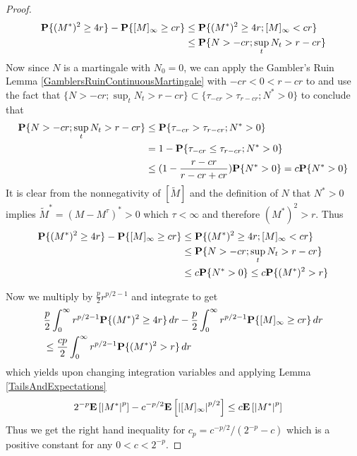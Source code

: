 \begin{proof}
\begin{align*}
\textbf{P}\{(M^*)^2 \geq 4r\} - \textbf{P}\{[M]_\infty \geq cr\} &\leq \textbf{P}\{(M^*)^2 \geq 4r; [M]_\infty < cr\} \\
&\leq \textbf{P}\{N > -cr; \sup_t N_t > r - cr\}
\end{align*}
Now since $N$ is a martingale with $N_0 = 0$, we can apply the Gambler's Ruin Lemma \ref{GamblersRuinContinuousMartingale} with $-cr < 0 < r - cr$ to and use the fact that $\lbrace N > -cr; \sup_t N_t > r - cr \rbrace \subset \lbrace \tau_{-cr} > \tau_{r - cr} ; N^* > 0 \rbrace$ to conclude that 
\begin{align*}
\textbf{P}\{N > -cr; \sup_t N_t > r - cr\} &\leq \textbf{P}\{\tau_{-cr} > \tau_{r - cr} ; N^* > 0\} \\
&= 1 - \textbf{P}\{\tau_{-cr} \leq \tau_{r - cr} ; N^* > 0\} \\
&\leq (1 - \frac{r - cr}{r -cr + cr})\textbf{P}\{N^* > 0\} = c \textbf{P}\{N^* > 0\}
\end{align*}
It is clear from the nonnegativity of $[\tilde{M}]$ and the definition of $N$ that $N^* > 0$ implies $\tilde{M}^*= (M-M^\tau)^* > 0$ which $\tau < \infty$ and therefore $(M^*)^2 > r$.  Thus
\begin{align*}
\textbf{P}\{(M^*)^2 \geq 4r\} - \textbf{P}\{[M]_\infty \geq cr\} &\leq \textbf{P}\{(M^*)^2 \geq 4r; [M]_\infty < cr\} \\
&\leq \textbf{P}\{N > -cr; \sup_t N_t > r - cr\} \\
&\leq c \textbf{P}\{N^* > 0\} \leq c \textbf{P}\{(M^*)^2 > r\}
\end{align*}

Now we multiply by $\frac{p}{2}r^{p/2-1}$ and integrate to get 
\begin{align*}
&\frac{p}{2}\int_0^\infty r^{p/2-1}\textbf{P}\{(M^*)^2 \geq 4r\} \, dr - \frac{p}{2}\int_0^\infty r^{p/2-1}\textbf{P}\{[M]_\infty \geq cr\} \, dr \\
&\leq \frac{cp}{2}\int_0^\infty r^{p/2-1} \textbf{P}\{(M^*)^2 > r\} \, dr \\
\end{align*}
which yields upon changing integration variables and applying Lemma \ref{TailsAndExpectations}
\begin{align*}
2^{-p} \textbf{E}\left[\left \vert M^* \right \vert^{p}\right] - c^{-p/2} \textbf{E}\left[\left \vert [M]_\infty \right \vert^{p/2}\right] &\leq c \textbf{E}\left[\left \vert M^* \right \vert^{p}\right]
\end{align*}
Thus we get the right hand inequality for $c_p = c^{-p/2}/(2^{-p} -c)$ which is a positive constant for any $0 < c < 2^{-p}$.


\end{proof}
